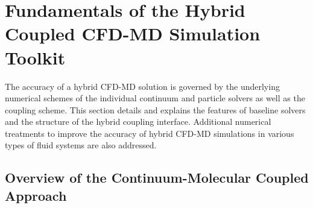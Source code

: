 \documentclass[preprint,12pt]{elsarticle}
\begin{document}
\section{Fundamentals of the Hybrid Coupled CFD-MD Simulation Toolkit}
\label{sec:numerical}


The accuracy of a hybrid CFD-MD solution is governed by the underlying numerical schemes of the individual continuum and particle solvers as well as the coupling scheme. This section details and explains the features of baseline solvers and the structure of the hybrid coupling interface. Additional numerical treatments to improve the accuracy of hybrid CFD-MD simulations in various types of fluid systems are also addressed.

\subsection{Overview of the Continuum-Molecular Coupled Approach}
\label{sec:numerical_hybridoverview}

\end{document}
